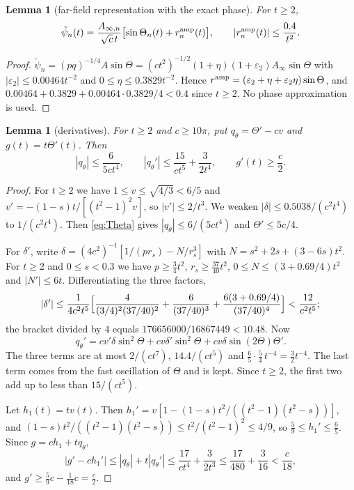 \documentclass[11pt]{amsart}
\newtheorem{lemma}[proposition]{Lemma}
\theoremstyle{remark}
\numberwithin{equation}{section}
\begin{document}
\begin{lemma}[far-field representation with the exact phase]\label{lem:far}
For $t\ge2$,
\[
\tilde\psi_n(t)=\frac{A_{\infty,n}}{\sqrt c\,t}\bigl[\sin\Theta_n(t)+r^{\rm amp}_n(t)\bigr],\qquad|r^{\rm amp}_n(t)|\le\frac{0.4}{t^2}.
\]
\end{lemma}
\begin{proof}
$\tilde\psi_n=(pq)^{-1/4}A\sin\Theta=(ct^2)^{-1/2}(1+\eta)(1+\varepsilon_2)A_\infty\sin\Theta$ with $|\varepsilon_2|\le0.00464t^{-2}$ and $0\le\eta\le0.3829t^{-2}$. Hence $r^{\rm amp}=(\varepsilon_2+\eta+\varepsilon_2\eta)\sin\Theta$, and $0.00464+0.3829+0.00464\cdot0.3829/4<0.4$ since $t\ge2$. No phase approximation is used.
\end{proof}

\begin{lemma}[derivatives]\label{lem:P}
For $t\ge2$ and $c\ge10\pi$, put $q_\theta=\Theta'-cv$ and $g(t)=t\Theta'(t)$. Then
\[
|q_\theta|\le\frac{6}{5ct^4},\qquad|q_\theta'|\le\frac{15}{ct^5}+\frac3{2t^4},\qquad g'(t)\ge\frac c2 .
\]
\end{lemma}
\begin{proof}
For $t\ge2$ we have $1\le v\le\sqrt{4/3}<6/5$ and $v'=-(1-s)t/[(t^2-1)^2v]$, so $|v'|\le2/t^3$. We weaken $|\delta|\le0.5038/(c^2t^4)$ to $1/(c^2t^4)$. Then \eqref{eq:Theta} gives $|q_\theta|\le6/(5ct^4)$ and $\Theta'\le5c/4$.

For $\delta'$, write $\delta=(4c^2)^{-1}[1/(pr_s)-N/r_s^3]$ with $N=s^2+2s+(3-6s)t^2$. For $t\ge2$ and $0\le s<0.3$ we have $p\ge\frac34t^2$, $r_s\ge\frac{37}{40}t^2$, $0\le N\le(3+0.69/4)t^2$ and $|N'|\le6t$. Differentiating the three factors,
\[
|\delta'|\le\frac1{4c^2t^5}\Bigl[\frac4{(3/4)^2(37/40)^2}+\frac6{(37/40)^3}+\frac{6(3+0.69/4)}{(37/40)^4}\Bigr]<\frac{12}{c^2t^5};
\]
the bracket divided by $4$ equals $176656000/16867449<10.48$. Now
\[
q_\theta'=cv'\delta\sin^2\Theta+cv\delta'\sin^2\Theta+cv\delta\sin(2\Theta)\Theta' .
\]
The three terms are at most $2/(ct^7)$, $14.4/(ct^5)$ and $\frac65\cdot\frac54\,t^{-4}=\frac3{2}t^{-4}$. The last term comes from the fast oscillation of $\Theta$ and is kept. Since $t\ge2$, the first two add up to less than $15/(ct^5)$.

Let $h_1(t)=tv(t)$. Then $h_1'=v[1-(1-s)t^2/((t^2-1)(t^2-s))]$, and $(1-s)t^2/((t^2-1)(t^2-s))\le t^2/(t^2-1)^2\le4/9$, so $\frac59\le h_1'\le\frac65$. Since $g=ch_1+tq_\theta$,
\[
|g'-ch_1'|\le|q_\theta|+t|q_\theta'|\le\frac{17}{ct^4}+\frac3{2t^3}\le\frac{17}{480}+\frac3{16}<\frac c{18},
\]
and $g'\ge\frac59c-\frac1{18}c=\frac c2$.
\end{proof}
\end{document}
